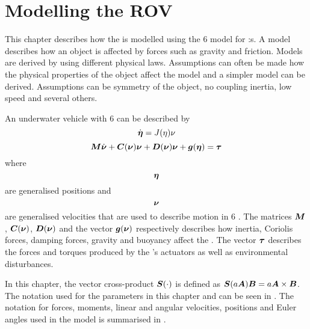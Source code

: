 \chapter{Modelling the ROV} \label{cha:modelling}
This chapter describes how the \abbrROV is modelled using the \citet{fossen2011} 6 \abbrDOF model for \abbrROV:s. A model describes how an object is affected by forces such as gravity and friction. Models are derived by using different physical laws. Assumptions can often be made how the physical properties of the object affect the model and a simpler model can be derived. Assumptions can be symmetry of the object, no coupling inertia, low speed and several others. 

An underwater vehicle with 6 \abbrDOF can be described by
\begin{equation}
\dot{\boldsymbol{\eta}} = J(\eta)\nu
\end{equation}
\begin{equation} \label{eq:model}
 \boldsymbol{M} \dot{\boldsymbol{\nu}} + \boldsymbol{C}(\boldsymbol{\nu})\boldsymbol{\nu} + \boldsymbol{D}(\boldsymbol{\nu})\boldsymbol{\nu} + \boldsymbol{g}(\boldsymbol{\eta}) = \boldsymbol{\tau} 
\end{equation}
where
\begin{equation*}
  \boldsymbol{\eta}  
\end{equation*} are generalised positions and
\begin{equation*}
  \boldsymbol{\nu}
\end{equation*}
are generalised velocities that are used to describe motion in 6 \abbrDOF \citep[p. 15]{fossen2011}. The matrices $\boldsymbol{M}$, $\boldsymbol{C}(\boldsymbol{\nu})$, $\boldsymbol{D}(\boldsymbol{\nu})$ and the vector $\boldsymbol{g}(\boldsymbol{\nu})$ respectively describes how inertia, Coriolis forces, damping forces, gravity and buoyancy affect the \abbrROV. The vector $\boldsymbol{\tau}$ describes the forces and torques produced by the \abbrROV's actuators as well as environmental disturbances.
 
In this chapter, the vector cross-product $\boldsymbol{S}(\cdot)$ is defined as $\boldsymbol{S}(a\boldsymbol{A}) \boldsymbol{B} = a\boldsymbol{A} \times \boldsymbol{B}$. The notation used for the parameters in this chapter and  can be seen in . The notation for forces, moments, linear and angular velocities, positions and Euler angles used in the model is summarised in . 

